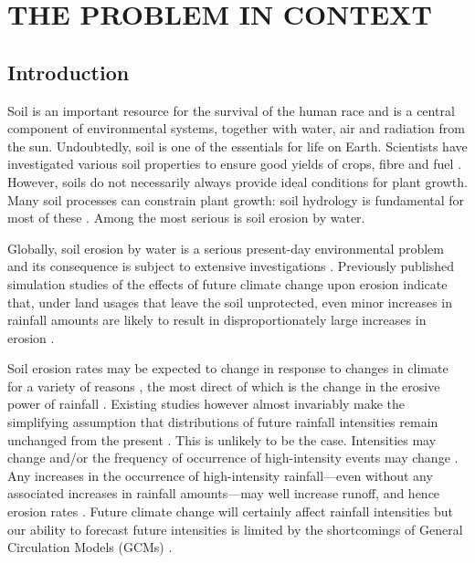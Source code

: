 \chapter{THE PROBLEM IN CONTEXT}
\label{sec:PROBLEMINTHECONTEXT}

\section{Introduction}
\label{sec:Rationale}
Soil is an important resource for the survival of the human race and is a
central component of environmental systems, together with water, air and
radiation from the sun. Undoubtedly, soil is one of the essentials for life on
Earth. Scientists have investigated various soil properties to ensure good
yields of crops, fibre and fuel \citep{cresser1993-192}. However, soils do not
necessarily always provide ideal conditions for plant growth. Many soil
processes can constrain plant growth: soil hydrology is fundamental for most of
these \citep{hudson1971-320, evans1980-mechanics, kirkby1980-1,
morgan1995-soil}. Among the most serious is soil erosion by water.

Globally, soil erosion by water is a serious present-day environmental problem
and its consequence is subject to extensive investigations
\citep{kirkby1980-1,morgan1995-soil}. Previously published simulation studies of
the effects of future climate change upon erosion indicate that, under land
usages that leave the soil unprotected, even minor increases in rainfall amounts
are likely to result in disproportionately large increases in erosion
\citep{kirkby1980-1, favis-mortlock1995-365}.

Soil erosion rates may be expected to change in response to changes in climate
for a variety of reasons \citep{pruski2002-climate}, the most direct of which is
the change in the erosive power of rainfall
\citep{favis-mortlock1996-529,williams1996-381,favis-mortlock1999-329,
nearing2001-229,pruski2002-climate}.
Existing studies however almost invariably make the simplifying assumption that
distributions of future rainfall intensities remain unchanged from the present
\citep{favis-mortlock1995-265,favis-mortlock1995-365,favis-mortlock1999-329,
pruski2002-climate,pruski2002-7,o'neal2005-165}. This is unlikely to be the
case. Intensities may change and/or the frequency of occurrence of
high-intensity events may change \citep{karl1995-217,houghton1996-climate,
watson1998-517,karl1998-231,osborn1998-505,osborn2002-1313,osborn2008-changing}.
Any increases in the occurrence of high-intensity rainfall---even without any
associated increases in rainfall amounts---may well increase runoff, and hence
erosion rates \citep{kirkby1980-1, morgan1995-soil, parsons2000-723}. Future
climate change will certainly affect rainfall intensities but our ability to
forecast future intensities is limited by the shortcomings of General
Circulation Models (GCMs) \citep{favis-mortlock1995-365}.

